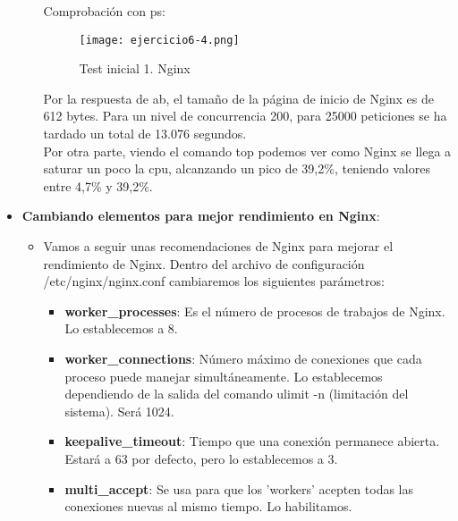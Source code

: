 \begin{itemize}
\begin{itemize}
				Comprobación con ps:
				\begin{figure}[H] 
					\centering
					\texttt{[image: ejercicio6-4.png]} 
					\label{figura30} 
					\caption{Test inicial 1. Nginx}
				\end{figure} 
			Por la respuesta de ab, el tamaño de la página de inicio de Nginx es de 612 bytes. Para un nivel de concurrencia 200, para 25000 peticiones se ha tardado un total de 13.076 segundos.\\
			
			Por otra parte, viendo el comando top podemos ver como Nginx se llega a saturar un poco la cpu, alcanzando un pico de 39,2\%, teniendo valores entre 4,7\% y 39,2\%.
			\end{itemize}
		\item \textbf{Cambiando elementos para mejor rendimiento en Nginx}:
			\begin{itemize}
				\item Vamos a seguir unas recomendaciones de Nginx para mejorar el rendimiento de Nginx\cite{ejercicio6-3,ejercicio6-4,ejercicio6-5}. Dentro del archivo de configuración /etc/nginx/nginx.conf cambiaremos los siguientes parámetros:
				\begin{itemize}
					\item \textbf{worker\_processes}: Es el número de procesos de trabajos de Nginx. Lo establecemos a 8.
					\item \textbf{worker\_connections}: Número máximo de conexiones que cada proceso puede manejar simultáneamente. Lo establecemos dependiendo de la salida del comando ulimit -n (limitación del sistema). Será 1024.
					\item \textbf{keepalive\_timeout}: Tiempo que una conexión permanece abierta. Estará a 63 por defecto, pero lo establecemos a 3.
					\item \textbf{multi\_accept}: Se usa para que los 'workers' acepten todas las conexiones nuevas al mismo tiempo. Lo habilitamos.
				\end{itemize}
			

\end{itemize}
\end{itemize}
